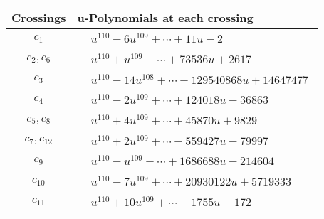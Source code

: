 \documentclass[1p]{elsarticle_modified}
\theoremstyle{definition}
\begin{document}
\begin{tabular}{m{50pt}|m{274pt}}
Crossings & \hspace{64pt}u-Polynomials at each crossing \\
\hline $$\begin{aligned}c_{1}\end{aligned}$$&$\begin{aligned}
&u^{110}-6 u^{109}+\cdots+11 u-2
\end{aligned}$\\
\hline $$\begin{aligned}c_{2},c_{6}\end{aligned}$$&$\begin{aligned}
&u^{110}+u^{109}+\cdots+73536 u+2617
\end{aligned}$\\
\hline $$\begin{aligned}c_{3}\end{aligned}$$&$\begin{aligned}
&u^{110}-14 u^{108}+\cdots+129540868 u+14647477
\end{aligned}$\\
\hline $$\begin{aligned}c_{4}\end{aligned}$$&$\begin{aligned}
&u^{110}-2 u^{109}+\cdots+124018 u-36863
\end{aligned}$\\
\hline $$\begin{aligned}c_{5},c_{8}\end{aligned}$$&$\begin{aligned}
&u^{110}+4 u^{109}+\cdots+45870 u+9829
\end{aligned}$\\
\hline $$\begin{aligned}c_{7},c_{12}\end{aligned}$$&$\begin{aligned}
&u^{110}+2 u^{109}+\cdots-559427 u-79997
\end{aligned}$\\
\hline $$\begin{aligned}c_{9}\end{aligned}$$&$\begin{aligned}
&u^{110}- u^{109}+\cdots+1686688 u-214604
\end{aligned}$\\
\hline $$\begin{aligned}c_{10}\end{aligned}$$&$\begin{aligned}
&u^{110}-7 u^{109}+\cdots+20930122 u+5719333
\end{aligned}$\\
\hline $$\begin{aligned}c_{11}\end{aligned}$$&$\begin{aligned}
&u^{110}+10 u^{109}+\cdots-1755 u-172
\end{aligned}$\\
\hline
\end{tabular}\\~\\
\end{document}
